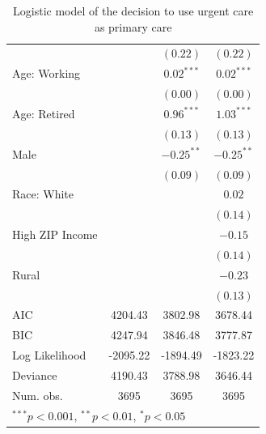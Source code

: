 \documentclass[12pt,twoside]{reedthesis}
\begin{document}
\begin{table}
\begin{center}
\begin{small}
\begin{tabular}{l c c c }
                                &               & $(0.22)$      & $(0.22)$      \\
  Age: Working                  &               & $0.02^{***}$  & $0.02^{***}$  \\
                                &               & $(0.00)$      & $(0.00)$      \\
  Age: Retired                  &               & $0.96^{***}$  & $1.03^{***}$  \\
                                &               & $(0.13)$      & $(0.13)$      \\
  Male                          &               & $-0.25^{**}$  & $-0.25^{**}$  \\
                                &               & $(0.09)$      & $(0.09)$      \\
  Race: White                   &               &               & $0.02$        \\
                                &               &               & $(0.14)$      \\
  High ZIP Income               &               &               & $-0.15$       \\
                                &               &               & $(0.14)$      \\
  Rural                         &               &               & $-0.23$       \\
                                &               &               & $(0.13)$      \\
  \hline
  AIC                           & 4204.43       & 3802.98       & 3678.44       \\
  BIC                           & 4247.94       & 3846.48       & 3777.87       \\
  Log Likelihood                & -2095.22      & -1894.49      & -1823.22      \\
  Deviance                      & 4190.43       & 3788.98       & 3646.44       \\
  Num. obs.                     & 3695          & 3695          & 3695          \\
  \hline
  \multicolumn{4}{l}{\tiny{$^{***}p<0.001$, $^{**}p<0.01$, $^*p<0.05$}}
  \end{tabular}
  \end{small}
  \caption{Logistic model of the decision to use urgent care as primary care}
  \label{table:coefficients}
  \end{center}
  \end{table}
  
\end{document}
